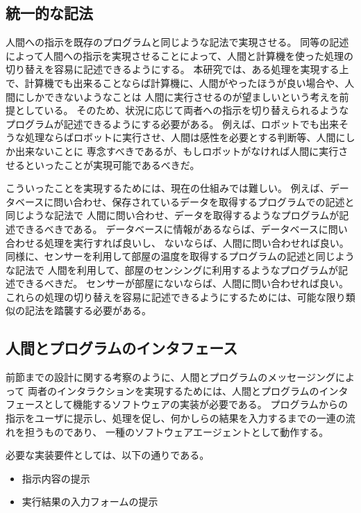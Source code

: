 \subsection{統一的な記法}\label{ux7d71ux4e00ux7684ux306aux8a18ux6cd5}

人間への指示を既存のプログラムと同じような記法で実現させる。
同等の記述によって人間への指示を実現させることによって、人間と計算機を使った処理の切り替えを容易に記述できるようにする。
本研究では、ある処理を実現する上で、計算機でも出来ることならば計算機に、人間がやったほうが良い場合や、人間にしかできないようなことは
人間に実行させるのが望ましいという考えを前提としている。
そのため、状況に応じて両者への指示を切り替えられるようなプログラムが記述できるようにする必要がある。
例えば、ロボットでも出来そうな処理ならばロボットに実行させ、人間は感性を必要とする判断等、人間にしか出来ないことに
専念すべきであるが、もしロボットがなければ人間に実行させるといったことが実現可能であるべきだ。

こういったことを実現するためには、現在の仕組みでは難しい。
例えば、データベースに問い合わせ、保存されているデータを取得するプログラムでの記述と同じような記法で
人間に問い合わせ、データを取得するようなプログラムが記述できるべきである。
データベースに情報があるならば、データベースに問い合わせる処理を実行すれば良いし、
ないならば、人間に問い合わせれば良い。
同様に、センサーを利用して部屋の温度を取得するプログラムの記述と同じような記法で
人間を利用して、部屋のセンシングに利用するようなプログラムが記述できるべきだ。
センサーが部屋にないならば、人間に問い合わせれば良い。
これらの処理の切り替えを容易に記述できるようにするためには、可能な限り類似の記法を踏襲する必要がある。

\subsection{人間とプログラムのインタフェース}\label{ux4ebaux9593ux3068ux30d7ux30edux30b0ux30e9ux30e0ux306eux30a4ux30f3ux30bfux30d5ux30a7ux30fcux30b9}

前節までの設計に関する考察のように、人間とプログラムのメッセージングによって
両者のインタラクションを実現するためには、人間とプログラムのインタフェースとして機能するソフトウェアの実装が必要である。
プログラムからの指示をユーザに提示し、処理を促し、何かしらの結果を入力するまでの一連の流れを担うものであり、
一種のソフトウェアエージェントとして動作する。

必要な実装要件としては、以下の通りである。

\begin{itemize}
\itemsep1pt\parskip0pt
\item
  指示内容の提示
\item
  実行結果の入力フォームの提示
\end{itemize}

